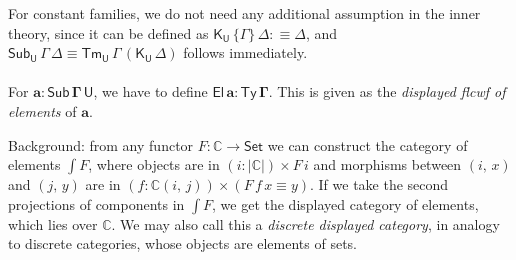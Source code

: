 \documentclass[12pt,a4paper,twoside,openany]{book}
\theoremstyle{remark}
\theoremstyle{definition}
\theoremstyle{theorem}
\newcommand{\mbb}[1]{\mathbb{#1}}
\newcommand{\bs}[1]{\boldsymbol{#1}}
\newcommand{\Sub}{\mathsf{Sub}}
\newcommand{\Tm}{\mathsf{Tm}}
\newcommand{\Ty}{\mathsf{Ty}}
\newcommand{\U}{\mathsf{U}}
\newcommand{\El}{\mathsf{El}}
\newcommand{\Set}{\mathsf{Set}}
\newcommand{\K}{\mathsf{K}}
\newcommand{\ba}{\bs{a}}
\newcommand{\bU}{\bs{\U}}
\newcommand{\mbbC}{\mbb{C}}
\newcommand{\defn}{:\equiv}
\begin{document}
For constant families, we do not need any additional assumption in the inner
theory, since it can be defined as $\K_{\bU}\,\{\Gamma\}\,\Delta \defn \Delta$,
and $\Sub_{\bU}\,\Gamma\,\Delta \equiv \Tm_{\bU}\,\Gamma\,(\K_{\bU}\,\Delta)$
follows immediately.
\\\\
\indent For $\bs{a : \Sub\,\Gamma\,\U}$, we have to define $\bs{\El\,a :
  \Ty\,\Gamma}$. This is given as the \emph{displayed flcwf of elements} of
$\ba$.

Background: from any functor $F : \mbbC \to \bs{\Set}$ we can construct the
category of elements $\int\!F$, where objects are in $(i : |\mbbC|) \times F\,i$
and morphisms between $(i,\,x)$ and $(j,\,y)$ are in $(f : \mbbC(i,\,j)) \times
(F\,f\,x \equiv y)$. If we take the second projections of components in $\int\!F$,
we get the displayed category of elements, which lies over $\mbbC$. We may also call
this a \emph{discrete displayed category}, in analogy to discrete categories, whose
objects are elements of sets.
\end{document}

